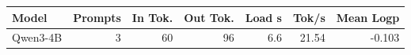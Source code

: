\begin{tabular}{lrrrrrr}
\toprule
Model & Prompts & In Tok. & Out Tok. & Load s & Tok/s & Mean Logp \\
\midrule
Qwen3-4B & 3 & 60 & 96 & 6.6 & 21.54 & -0.103 \\
\bottomrule
\end{tabular}

